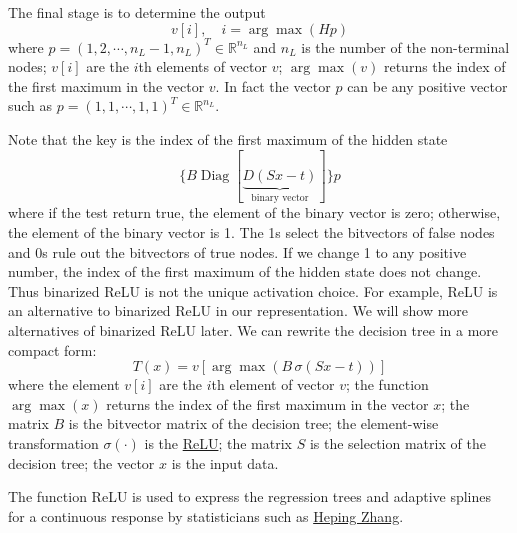 \documentclass[UTF8]{article}
\begin{document}
The final stage is to determine the output
\begin{equation}v[i],\quad
i=\arg\max(Hp)\end{equation}
where $p=(1, 2, \cdots, n_L-1, n_L)^T\in\mathbb{R}^{n_L}$ and $n_L$ is the number of the non-terminal nodes;
$v[i]$ are the $i$th elements of vector $v$; $\arg\max(v)$ returns the index of the first maximum in the vector $v$.
In fact the vector $p$ can be any positive vector such as $p=(1, 1, \cdots, 1,1)^T\in\mathbb{R}^{n_L}$.


Note that the key is the index of the first maximum of the hidden state
$$\{B\operatorname{Diag}[\underbrace{D(Sx-t)}_{\text{binary vector}}]\}p$$
where if the test return true, the  element of the binary vector is zero;
otherwise, the element of the binary vector is 1.
The 1s select the bitvectors of false nodes and
0s rule out the bitvectors of true nodes.
If we change 1 to any positive number,
the index of the first maximum of the hidden state does not change.
Thus binarized ReLU is not the unique activation choice.
For example, ReLU is  an alternative to binarized ReLU in our representation.
We will show more alternatives of binarized ReLU later.
We can rewrite the decision tree in a more compact form:
\begin{equation}\label{tree}
T(x)=v[\arg\max(B\,\sigma(Sx-t))]
\end{equation}
where  the element $v[i]$ are the $i$th element of vector $v$;
the function $\arg\max(x)$ returns the index of the first maximum in the vector $x$;
the matrix $B$ is the bitvector matrix of the decision tree;
the element-wise transformation $\sigma(\cdot)$ is the \href{https://arxiv.org/abs/1611.01491}{ReLU};
the matrix $S$ is the selection matrix of the decision tree;
the vector $x$ is the input data.


The function ReLU is used to express the regression trees and adaptive splines for a continuous response
by statisticians such as \href{https://link.springer.com/book/10.1007/978-1-4419-6824-1}{Heping Zhang}.
\end{document}
